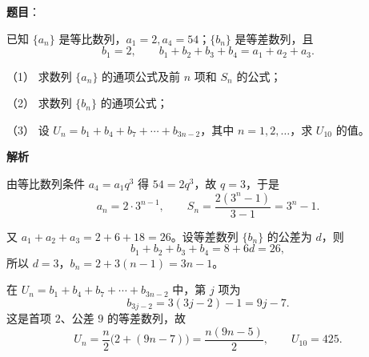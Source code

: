 \begin{answer}

\textbf{题目}：

已知 $\{a_n\}$ 是等比数列，$a_1=2,a_4=54$；$\{b_n\}$ 是等差数列，且
\nopagebreak[4]
\[
b_1=2,\qquad b_1+b_2+b_3+b_4=a_1+a_2+a_3.
\]

（1） 求数列 $\{a_n\}$ 的通项公式及前 $n$ 项和 $S_n$ 的公式；

（2） 求数列 $\{b_n\}$ 的通项公式；

（3） 设 $U_n=b_1+b_4+b_7+\cdots+b_{3n-2}$，其中 $n=1,2,\ldots$，求 $U_{10}$ 的值。

\textbf{解析}


由等比数列条件 $a_4=a_1q^3$ 得 $54=2q^3$，故 $q=3$，于是
\nopagebreak[4]
\[
a_n=2\cdot3^{n-1},\qquad S_n=\frac{2(3^n-1)}{3-1}=3^n-1.
\]


又 $a_1+a_2+a_3=2+6+18=26$。设等差数列 $\{b_n\}$ 的公差为 $d$，则
\nopagebreak[4]
\[
b_1+b_2+b_3+b_4=8+6d=26,
\]
所以 $d=3$，$b_n=2+3(n-1)=3n-1$。


在 $U_n=b_1+b_4+b_7+\cdots+b_{3n-2}$ 中，第 $j$ 项为
\nopagebreak[4]
\[
b_{3j-2}=3(3j-2)-1=9j-7.
\]
这是首项 $2$、公差 $9$ 的等差数列，故
\nopagebreak[4]
\[
U_n=\frac n2\bigl(2+(9n-7)\bigr)=\frac{n(9n-5)}2,
\qquad U_{10}=425.
\]




\end{answer}
